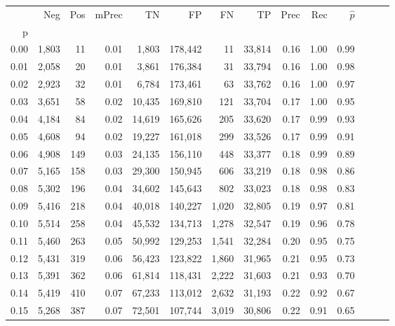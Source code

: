 \begin{tabular}{rrrrrrrrrrrrrr}
\toprule
{} &    Neg &  Pos & mPrec &       TN &       FP &      FN &      TP &  Prec &   Rec & $\hat{p}$ \\
p    &        &      &       &          &          &         &         &       &       &           \\
\midrule
0.00 &  1,803 &   11 &  0.01 &    1,803 &  178,442 &      11 &  33,814 &  0.16 &  1.00 &      0.99 \\
0.01 &  2,058 &   20 &  0.01 &    3,861 &  176,384 &      31 &  33,794 &  0.16 &  1.00 &      0.98 \\
0.02 &  2,923 &   32 &  0.01 &    6,784 &  173,461 &      63 &  33,762 &  0.16 &  1.00 &      0.97 \\
0.03 &  3,651 &   58 &  0.02 &   10,435 &  169,810 &     121 &  33,704 &  0.17 &  1.00 &      0.95 \\
0.04 &  4,184 &   84 &  0.02 &   14,619 &  165,626 &     205 &  33,620 &  0.17 &  0.99 &      0.93 \\
0.05 &  4,608 &   94 &  0.02 &   19,227 &  161,018 &     299 &  33,526 &  0.17 &  0.99 &      0.91 \\
0.06 &  4,908 &  149 &  0.03 &   24,135 &  156,110 &     448 &  33,377 &  0.18 &  0.99 &      0.89 \\
0.07 &  5,165 &  158 &  0.03 &   29,300 &  150,945 &     606 &  33,219 &  0.18 &  0.98 &      0.86 \\
0.08 &  5,302 &  196 &  0.04 &   34,602 &  145,643 &     802 &  33,023 &  0.18 &  0.98 &      0.83 \\
0.09 &  5,416 &  218 &  0.04 &   40,018 &  140,227 &   1,020 &  32,805 &  0.19 &  0.97 &      0.81 \\
0.10 &  5,514 &  258 &  0.04 &   45,532 &  134,713 &   1,278 &  32,547 &  0.19 &  0.96 &      0.78 \\
0.11 &  5,460 &  263 &  0.05 &   50,992 &  129,253 &   1,541 &  32,284 &  0.20 &  0.95 &      0.75 \\
0.12 &  5,431 &  319 &  0.06 &   56,423 &  123,822 &   1,860 &  31,965 &  0.21 &  0.95 &      0.73 \\
0.13 &  5,391 &  362 &  0.06 &   61,814 &  118,431 &   2,222 &  31,603 &  0.21 &  0.93 &      0.70 \\
0.14 &  5,419 &  410 &  0.07 &   67,233 &  113,012 &   2,632 &  31,193 &  0.22 &  0.92 &      0.67 \\
0.15 &  5,268 &  387 &  0.07 &   72,501 &  107,744 &   3,019 &  30,806 &  0.22 &  0.91 &      0.65 \\

\end{tabular}
